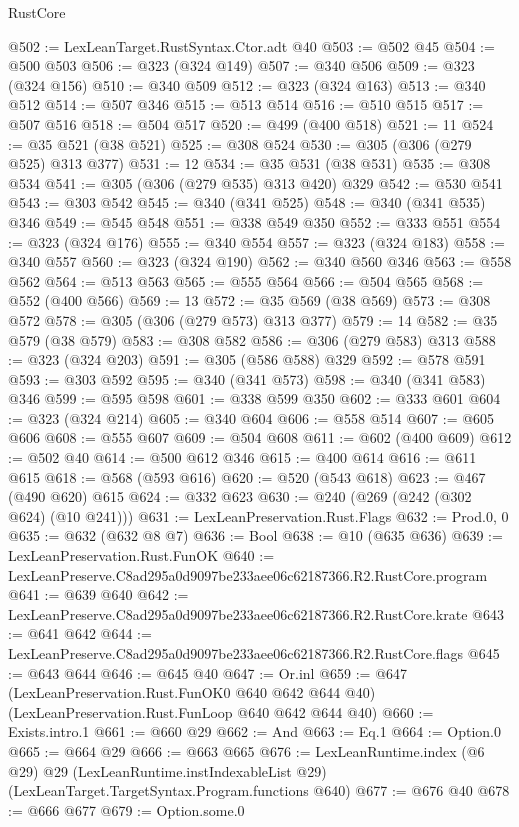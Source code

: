 \begin{lexlean}{RustCore}
\begin{coremodule}
@502 := LexLeanTarget.RustSyntax.Ctor.adt @40
@503 := @502 @45
@504 := @500 @503
@506 := @323 (@324 @149)
@507 := @340 @506
@509 := @323 (@324 @156)
@510 := @340 @509
@512 := @323 (@324 @163)
@513 := @340 @512
@514 := @507 @346
@515 := @513 @514
@516 := @510 @515
@517 := @507 @516
@518 := @504 @517
@520 := @499 (@400 @518)
@521 := 11
@524 := @35 @521 (@38 @521)
@525 := @308 @524
@530 := @305 (@306 (@279 @525) @313 @377)
@531 := 12
@534 := @35 @531 (@38 @531)
@535 := @308 @534
@541 := @305 (@306 (@279 @535) @313 @420) @329
@542 := @530 @541
@543 := @303 @542
@545 := @340 (@341 @525)
@548 := @340 (@341 @535) @346
@549 := @545 @548
@551 := @338 @549 @350
@552 := @333 @551
@554 := @323 (@324 @176)
@555 := @340 @554
@557 := @323 (@324 @183)
@558 := @340 @557
@560 := @323 (@324 @190)
@562 := @340 @560 @346
@563 := @558 @562
@564 := @513 @563
@565 := @555 @564
@566 := @504 @565
@568 := @552 (@400 @566)
@569 := 13
@572 := @35 @569 (@38 @569)
@573 := @308 @572
@578 := @305 (@306 (@279 @573) @313 @377)
@579 := 14
@582 := @35 @579 (@38 @579)
@583 := @308 @582
@586 := @306 (@279 @583) @313
@588 := @323 (@324 @203)
@591 := @305 (@586 @588) @329
@592 := @578 @591
@593 := @303 @592
@595 := @340 (@341 @573)
@598 := @340 (@341 @583) @346
@599 := @595 @598
@601 := @338 @599 @350
@602 := @333 @601
@604 := @323 (@324 @214)
@605 := @340 @604
@606 := @558 @514
@607 := @605 @606
@608 := @555 @607
@609 := @504 @608
@611 := @602 (@400 @609)
@612 := @502 @40
@614 := @500 @612 @346
@615 := @400 @614
@616 := @611 @615
@618 := @568 (@593 @616)
@620 := @520 (@543 @618)
@623 := @467 (@490 @620) @615
@624 := @332 @623
@630 := @240 (@269 (@242 (@302 @624) (@10 @241)))
@631 := LexLeanPreservation.Rust.Flags
@632 := Prod.{0, 0}
@635 := @632 (@632 @8 @7)
@636 := Bool
@638 := @10 (@635 @636)
@639 := LexLeanPreservation.Rust.FunOK
@640 := LexLeanPreserve.C8ad295a0d9097be233aee06c62187366.R2.RustCore.program
@641 := @639 @640
@642 := LexLeanPreserve.C8ad295a0d9097be233aee06c62187366.R2.RustCore.krate
@643 := @641 @642
@644 := LexLeanPreserve.C8ad295a0d9097be233aee06c62187366.R2.RustCore.flags
@645 := @643 @644
@646 := @645 @40
@647 := Or.inl
@659 := @647
    (LexLeanPreservation.Rust.FunOK0 @640 @642 @644 @40)
    (LexLeanPreservation.Rust.FunLoop @640 @642 @644 @40)
@660 := Exists.intro.{1}
@661 := @660 @29
@662 := And
@663 := Eq.{1}
@664 := Option.{0}
@665 := @664 @29
@666 := @663 @665
@676 := LexLeanRuntime.index
    (@6 @29)
    @29
    (LexLeanRuntime.instIndexableList @29)
    (LexLeanTarget.TargetSyntax.Program.functions @640)
@677 := @676 @40
@678 := @666 @677
@679 := Option.some.{0}

\end{coremodule}
\end{lexlean}
